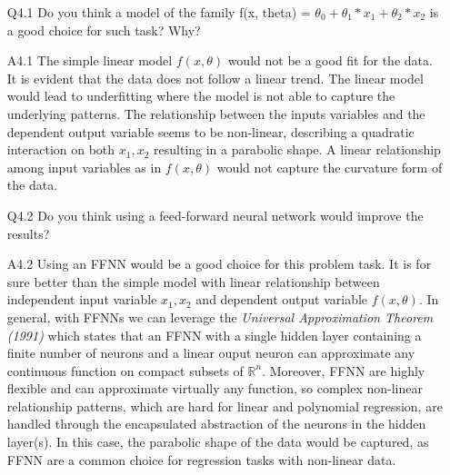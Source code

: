 \documentclass[unicode, 11pt, a4paper]{scrartcl}
\begin{document}
\begin{itemize}
	\item[Q4.1] Do you think a model of the family f(x, theta) = $\theta_0 + \theta_1 * x_1 + \theta_2 * x_2$ is a good choice for such task? Why?

	\item[A4.1] The simple linear model $f(x, \theta)$ would not be a good fit for the data.
	      It is evident that the data does not follow a linear trend.
	      The linear model would lead to underfitting where the model is not able
	      to capture the underlying patterns.
	      The relationship between the inputs variables
	      and the dependent output variable seems to be non-linear,
	      describing a quadratic interaction on both $x_1, x_2$ resulting in a parabolic shape.
	      A linear relationship among input variables as in $f(x, \theta)$
	      would not capture the curvature form of the data.

	\item[Q4.2] Do you think using a feed-forward neural network would improve the results?

	\item[A4.2] Using an FFNN would be a good choice for this problem task.
	      It is for sure better than the simple model with linear relationship
	      between independent input variable $x_1, x_2$
	      and dependent output variable $f(x, \theta)$.
	      In general, with FFNNs we can leverage the \textit{Universal Approximation Theorem (1991)}
	      which states that an FFNN with a single hidden layer containing a finite number of neurons
	      and a linear ouput neuron can approximate any continuous function
	      on compact subsets of $\mathbb{R}^n$.
	      Moreover, FFNN are highly flexible and can approximate virtually any function,
	      so complex non-linear relationship patterns,
	      which are hard for linear and polynomial regression,
	      are handled through the encapsulated abstraction of the neurons in the hidden layer(s).
	      In this case, the parabolic shape of the data would be captured,
	      as FFNN are a common choice for regression tasks with non-linear data.

\end{itemize}
\end{document}
